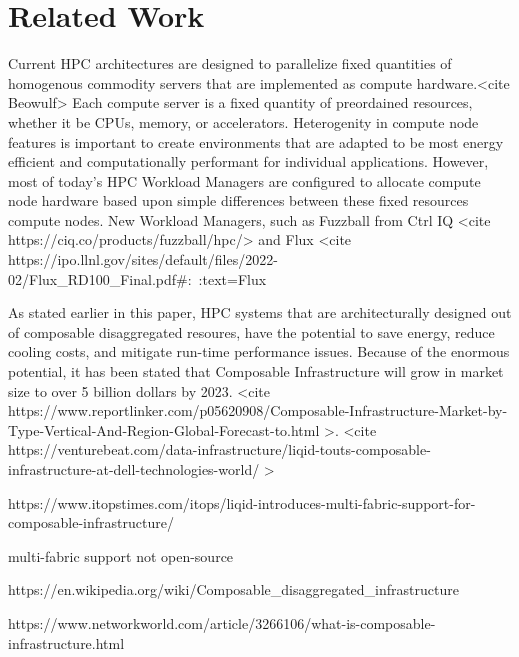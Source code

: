 \section{Related Work}
Current HPC architectures are designed to parallelize fixed quantities of homogenous commodity servers that are implemented as compute hardware.<cite Beowulf>  Each compute server is a fixed quantity of preordained resources, whether it be CPUs, memory, or accelerators.  Heterogenity in compute node features is important to create environments that are adapted to be most energy efficient and computationally performant for individual applications.  However, most of today's HPC Workload Managers are configured to allocate compute node hardware based upon simple differences between these fixed resources compute nodes.  New Workload Managers, such as Fuzzball from Ctrl IQ <cite https://ciq.co/products/fuzzball/hpc/> and Flux <cite https://ipo.llnl.gov/sites/default/files/2022-02/Flux_RD100_Final.pdf#:~:text=Flux%
 
As stated earlier in this paper, HPC systems that are architecturally designed out of composable disaggregated resoures, have the potential to save energy, reduce cooling costs, and mitigate run-time performance issues.  Because of the enormous potential, it has been stated that Composable Infrastructure will grow in market size to over 5 billion dollars by 2023. <cite https://www.reportlinker.com/p05620908/Composable-Infrastructure-Market-by-Type-Vertical-And-Region-Global-Forecast-to.html >. <cite https://venturebeat.com/data-infrastructure/liqid-touts-composable-infrastructure-at-dell-technologies-world/ >





https://www.itopstimes.com/itops/liqid-introduces-multi-fabric-support-for-composable-infrastructure/

multi-fabric support not open-source





https://en.wikipedia.org/wiki/Composable_disaggregated_infrastructure

https://www.networkworld.com/article/3266106/what-is-composable-infrastructure.html

